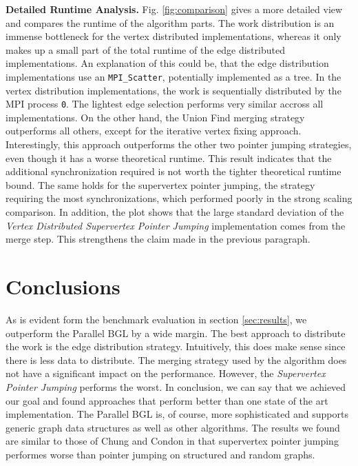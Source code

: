 \documentclass[letterpaper]{article}
\newcommand{\mypar}[1]{{\bf #1.}}
\begin{document}
\mypar{Detailed Runtime Analysis}
Fig. \ref{fig:comparison} gives a more detailed view and compares the runtime of the algorithm parts. The work
distribution is an immense bottleneck for the vertex distributed implementations, whereas it only makes up a small part
of the total runtime of the edge distributed implementations. An explanation of this could be, that the edge
distribution implementations use an \verb|MPI_Scatter|, potentially implemented as a tree. In the vertex distribution
implementations, the work is sequentially distributed by the MPI process \verb|0|. The lightest edge selection performs
very similar accross all implementations. On the other hand, the Union Find merging strategy outperforms all others,
except for the iterative vertex fixing approach. Interestingly, this approach outperforms the other two pointer jumping
strategies, even though it has a worse theoretical runtime. This result indicates that the additional synchronization
required is not worth the tighter theoretical runtime bound. The same holds for the supervertex pointer jumping, the
strategy requiring the most synchronizations, which performed poorly in the strong scaling comparison. In addition, the
plot shows that the large standard deviation of the \emph{Vertex Distributed Supervertex Pointer Jumping} implementation
comes from the merge step. This strengthens the claim made in the previous paragraph.

\section{Conclusions}
As is evident form the benchmark evaluation in section \ref{sec:results}, we outperform the Parallel BGL by a wide
margin. The best approach to distribute the work is the edge distribution strategy. Intuitively, this does make sense
since there is less data to distribute. The merging strategy used by the algorithm does not have a significant impact on
the performance. However, the \emph{Supervertex Pointer Jumping} performs the worst. In conclusion, we can say that we
achieved our goal and found approaches that perform better than one state of the art implementation. The Parallel BGL
is, of course, more sophisticated and supports generic graph data structures as well as other algorithms. The results we
found are similar to those of Chung and Condon \cite{chung1996parallel} in that supervertex pointer jumping performes
worse than pointer jumping on structured and random graphs.
\end{document}
